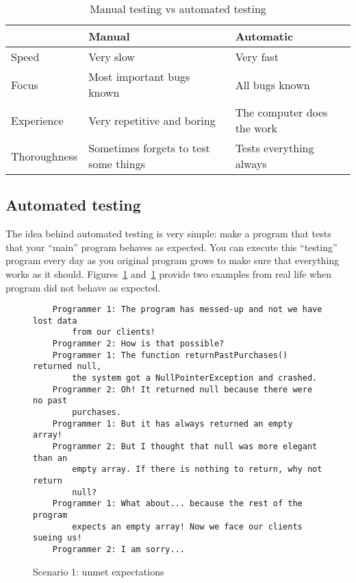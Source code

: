 \begin{table}[htbp]
  \centering
  \begin{tabular}{|p{3cm}|p{5cm}|p{5cm}|}
    \hline
    & Manual & Automatic \\
    \hline
    Speed & Very slow & Very fast \\
    Focus & Most important bugs known & All bugs known \\
    Experience & Very repetitive and boring & The computer does the work \\
    Thoroughness & Sometimes forgets to test some things & Tests everything always \\
    \hline
  \end{tabular}
  \caption{Manual testing vs automated testing}
  \label{tab:test}
\end{table}

\subsection{Automated testing}
\label{sec:automated-testing}

The idea behind automated testing is very simple: make a program that
tests that your ``main'' program behaves as expected. You can execute
this ``testing'' program every day as you original program grows to
make sure that everything works as it
should. Figures~\ref{fig:sdfsdsers} and~\ref{fig:sdfsdsers} provide
two examples from real life when program did not behave as expected. 

\begin{figure}[tbp]
\begin{verbatim}
    Programmer 1: The program has messed-up and not we have lost data
        from our clients!
    Programmer 2: How is that possible?
    Programmer 1: The function returnPastPurchases() returned null,
        the system got a NullPointerException and crashed. 
    Programmer 2: Oh! It returned null because there were no past
        purchases. 
    Programmer 1: But it has always returned an empty array! 
    Programmer 2: But I thought that null was more elegant than an
        empty array. If there is nothing to return, why not return
        null? 
    Programmer 1: What about... because the rest of the program
        expects an empty array! Now we face our clients sueing us!
    Programmer 2: I am sorry...
\end{verbatim}  
  \caption{Scenario 1: unmet expectations}
  \label{fig:sdfsdsers}
\end{figure}

